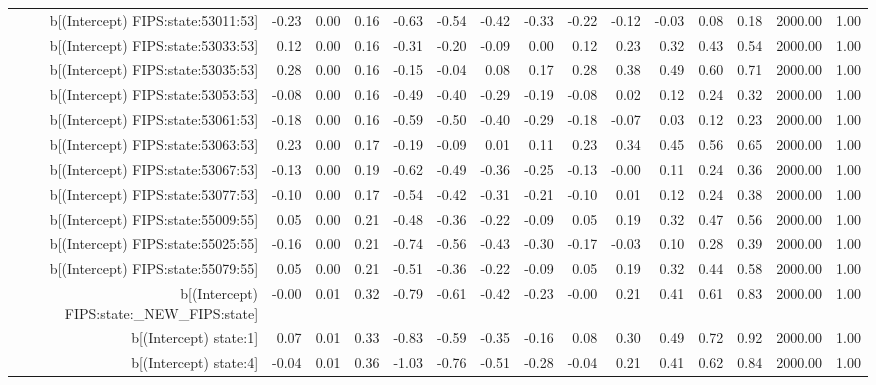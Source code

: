 \begin{table}[ht]
\begin{tabular}{rrrrrrrrrrrrrrr}
  b[(Intercept) FIPS:state:53011:53] & -0.23 & 0.00 & 0.16 & -0.63 & -0.54 & -0.42 & -0.33 & -0.22 & -0.12 & -0.03 & 0.08 & 0.18 & 2000.00 & 1.00 \\ 
  b[(Intercept) FIPS:state:53033:53] & 0.12 & 0.00 & 0.16 & -0.31 & -0.20 & -0.09 & 0.00 & 0.12 & 0.23 & 0.32 & 0.43 & 0.54 & 2000.00 & 1.00 \\ 
  b[(Intercept) FIPS:state:53035:53] & 0.28 & 0.00 & 0.16 & -0.15 & -0.04 & 0.08 & 0.17 & 0.28 & 0.38 & 0.49 & 0.60 & 0.71 & 2000.00 & 1.00 \\ 
  b[(Intercept) FIPS:state:53053:53] & -0.08 & 0.00 & 0.16 & -0.49 & -0.40 & -0.29 & -0.19 & -0.08 & 0.02 & 0.12 & 0.24 & 0.32 & 2000.00 & 1.00 \\ 
  b[(Intercept) FIPS:state:53061:53] & -0.18 & 0.00 & 0.16 & -0.59 & -0.50 & -0.40 & -0.29 & -0.18 & -0.07 & 0.03 & 0.12 & 0.23 & 2000.00 & 1.00 \\ 
  b[(Intercept) FIPS:state:53063:53] & 0.23 & 0.00 & 0.17 & -0.19 & -0.09 & 0.01 & 0.11 & 0.23 & 0.34 & 0.45 & 0.56 & 0.65 & 2000.00 & 1.00 \\ 
  b[(Intercept) FIPS:state:53067:53] & -0.13 & 0.00 & 0.19 & -0.62 & -0.49 & -0.36 & -0.25 & -0.13 & -0.00 & 0.11 & 0.24 & 0.36 & 2000.00 & 1.00 \\ 
  b[(Intercept) FIPS:state:53077:53] & -0.10 & 0.00 & 0.17 & -0.54 & -0.42 & -0.31 & -0.21 & -0.10 & 0.01 & 0.12 & 0.24 & 0.38 & 2000.00 & 1.00 \\ 
  b[(Intercept) FIPS:state:55009:55] & 0.05 & 0.00 & 0.21 & -0.48 & -0.36 & -0.22 & -0.09 & 0.05 & 0.19 & 0.32 & 0.47 & 0.56 & 2000.00 & 1.00 \\ 
  b[(Intercept) FIPS:state:55025:55] & -0.16 & 0.00 & 0.21 & -0.74 & -0.56 & -0.43 & -0.30 & -0.17 & -0.03 & 0.10 & 0.28 & 0.39 & 2000.00 & 1.00 \\ 
  b[(Intercept) FIPS:state:55079:55] & 0.05 & 0.00 & 0.21 & -0.51 & -0.36 & -0.22 & -0.09 & 0.05 & 0.19 & 0.32 & 0.44 & 0.58 & 2000.00 & 1.00 \\ 
  b[(Intercept) FIPS:state:\_NEW\_FIPS:state] & -0.00 & 0.01 & 0.32 & -0.79 & -0.61 & -0.42 & -0.23 & -0.00 & 0.21 & 0.41 & 0.61 & 0.83 & 2000.00 & 1.00 \\ 
  b[(Intercept) state:1] & 0.07 & 0.01 & 0.33 & -0.83 & -0.59 & -0.35 & -0.16 & 0.08 & 0.30 & 0.49 & 0.72 & 0.92 & 2000.00 & 1.00 \\ 
  b[(Intercept) state:4] & -0.04 & 0.01 & 0.36 & -1.03 & -0.76 & -0.51 & -0.28 & -0.04 & 0.21 & 0.41 & 0.62 & 0.84 & 2000.00 & 1.00 \\ 

\end{tabular}
\end{table}
